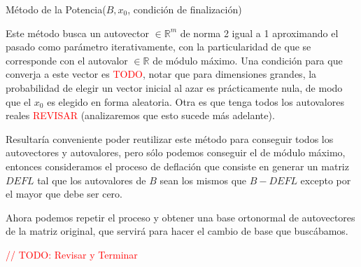\begin{algorithm}
\begin{algorithmic}[1]
\ENDWHILE
{}
\end{algorithmic}
\caption{M\'etodo de la Potencia($B, x_{0}$, condici\'on de finalizaci\'on)}
\end{algorithm}

Este m\'etodo busca un autovector $\in \mathbb{R}^{m}$ de norma 2 igual a 1 aproximando el pasado como par\'ametro iterativamente, con la particularidad de que se corresponde con el autovalor $\in \mathbb{R}$ de m\'odulo m\'aximo. Una condici\'on para que converja a este vector es \textcolor{red}{TODO}, notar que para dimensiones grandes, la probabilidad de elegir un vector inicial al azar es pr\'acticamente nula, de modo que el $x_{0}$ es elegido en forma aleatoria. Otra es que tenga todos los autovalores reales \textcolor{red}{REVISAR} (analizaremos que esto sucede m\'as adelante).

Resultar\'ia conveniente poder reutilizar este m\'etodo para conseguir todos los autovectores y autovalores, pero s\'olo podemos conseguir el de m\'odulo m\'aximo, entonces consideramos el proceso de deflaci\'on que consiste en generar un matriz $DEFL$ tal que los autovalores de $B$ sean los mismos que $B - DEFL$ excepto por el mayor que debe ser cero.

Ahora podemos repetir el proceso y obtener una base ortonormal de autovectores de la matriz original, que servir\'a para hacer el cambio de base que busc\'abamos.

\textcolor{red}{// TODO: Revisar y Terminar}